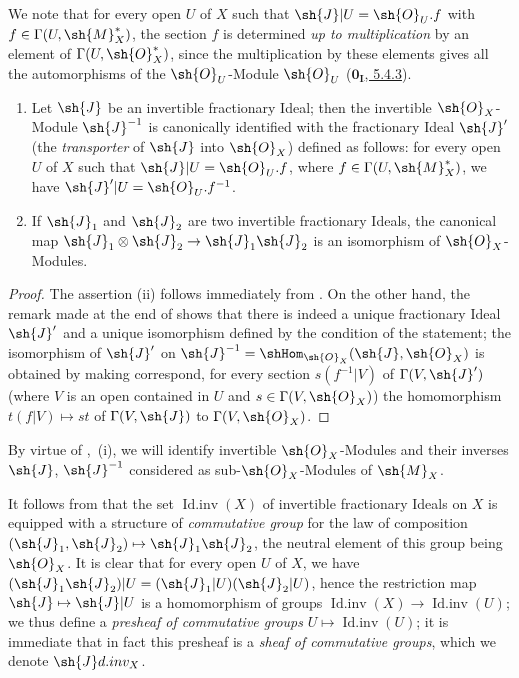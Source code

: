 
We note that for every open $U$ of $X$ such that $\sh{J}|U=\sh{O}_U.f$ with $f\in\Gamma(U,\sh{M}_X^*)$, the section $f$ is determined \emph{up to multiplication} by an element of $\Gamma(U,\sh{O}_X^*)$, since the
multiplication by these elements gives all the automorphisms of the $\sh{O}_U$-Module $\sh{O}_U$ (\hyperref[0.5.4.3]{$\mathbf{0_I}$, 5.4.3}).

\begin{corollary}[21.2.3]
\label{IV.21.2.3}
\begin{enumerate}[label=(\roman*)]
  \item Let $\sh{J}$ be an invertible fractionary Ideal;
  then the invertible $\sh{O}_X$-Module $\sh{J}^{-1}$ is canonically identified with the fractionary Ideal $\sh{J}'$ (the \emph{transporter} of $\sh{J}$ into $\sh{O}_X$) defined as follows:
  for every open $U$ of $X$ such that $\sh{J}|U=\sh{O}_U.f$, where $f\in\Gamma(U,\sh{M}_X^*)$, we have $\sh{J}'|U=\sh{O}_U.f^{-1}$.
  \item If $\sh{J}_1$ and $\sh{J}_2$ are two invertible fractionary Ideals, the canonical map $\sh{J}_1\otimes\sh{J}_2\to\sh{J}_1\sh{J}_2$ is an isomorphism of $\sh{O}_X$-Modules.
\end{enumerate}
\end{corollary}

\begin{proof}
The assertion (ii) follows immediately from .
On the other hand, the remark made at the end of  shows that there is indeed a unique fractionary Ideal $\sh{J}'$ and a unique isomorphism defined by the condition of the statement;
the isomorphism of $\sh{J}'$ on $\sh{J}^{-1}=\shHom_{\sh{O}_X}(\sh{J},\sh{O}_X)$ is obtained by making correspond, for every section $s(f^{-1}|V)$ of $\Gamma(V,\sh{J}')$ (where $V$ is an open contained in $U$ and $s\in\Gamma(V,\sh{O}_X)$) the homomorphism $t(f|V)\mapsto st$ of $\Gamma(V,\sh{J})$ to $\Gamma(V,\sh{O}_X)$.
\end{proof}

By virtue of ,~(i), we will identify invertible $\sh{O}_X$-Modules and their inverses $\sh{J}$, $\sh{J}^{-1}$ considered as sub-$\sh{O}_X$-Modules of $\sh{M}_X$.

\begin{env}[21.2.4]
\label{IV.21.2.4}
It follows from  that the set $\operatorname{Id.inv}(X)$ of invertible fractionary Ideals on $X$ is equipped with a structure of \emph{commutative group} for the law of composition $(\sh{J}_1,\sh{J}_2)\mapsto\sh{J}_1\sh{J}_2$, the neutral element of this group being $\sh{O}_X$.
It is clear that for every open $U$ of $X$, we have $(\sh{J}_1\sh{J}_2)|U=(\sh{J}_1|U)(\sh{J}_2|U)$, hence the restriction map $\sh{J}\mapsto\sh{J}|U$ is a homomorphism of groups $\operatorname{Id.inv}(X)\to\operatorname{Id.inv}(U)$;
we thus define a \emph{presheaf of commutative groups} $U\mapsto\operatorname{Id.inv}(U)$;
it is immediate that in fact this presheaf is a \emph{sheaf of commutative groups}, which we denote $\sh{J}d.inv_X$.
\end{env}

